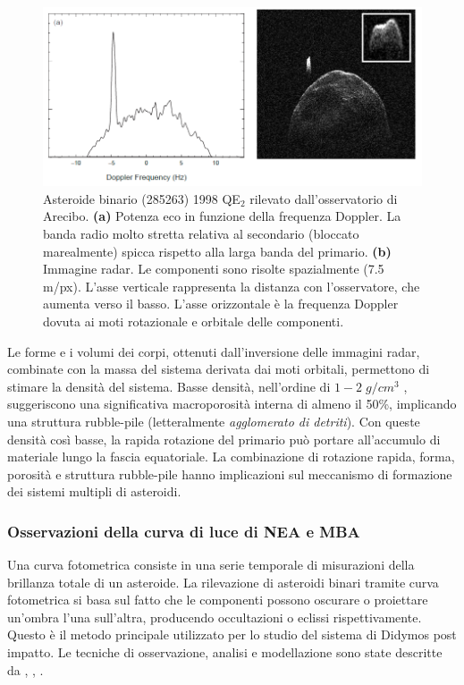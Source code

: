 \documentclass[a4paper,11pt,openright]{book}
\begin{document}
\begin{figure}[!h]
    \centering
    \includegraphics[scale=0.4]{figure/radar_image.png}
    \caption[Asteroide binario (285263) 1998 QE$_2$ rilevato dall'osservatorio di Arecibo.]{Asteroide binario (285263) 1998 QE$_2$ rilevato dall'osservatorio di Arecibo. \textbf{(a)} Potenza eco in funzione della frequenza Doppler. La banda radio molto stretta relativa al secondario (bloccato marealmente) spicca rispetto alla larga banda del primario. \textbf{(b)} Immagine radar. Le componenti sono risolte spazialmente (7.5 m/px). L'asse verticale rappresenta la distanza con l'osservatore, che aumenta verso il basso. L'asse orizzontale è la frequenza Doppler dovuta ai moti rotazionale e orbitale delle componenti. \citep{michel_asteroid_2015-1}}
    \label{fig:radar_image}
\end{figure}

Le forme e i volumi dei corpi, ottenuti dall'inversione delle immagini radar, combinate con la massa del sistema derivata dai moti orbitali, permettono di stimare la densità del sistema. Basse densità, nell'ordine di $1-2\;g/cm^3$ \citep{becker_physical_2015, brozovic_radar_2011}, suggeriscono una significativa macroporosità interna di almeno il 50\%, implicando una struttura rubble-pile (letteralmente \textit{agglomerato di detriti}). Con queste densità così basse, la rapida rotazione del primario può portare all'accumulo di materiale lungo la fascia equatoriale. La combinazione di rotazione rapida, forma, porosità e struttura rubble-pile hanno implicazioni sul meccanismo di formazione dei sistemi multipli di asteroidi.

\subsubsection{Osservazioni della curva di luce di NEA e MBA}
Una curva fotometrica consiste in una serie temporale di misurazioni della brillanza totale di un asteroide. La rilevazione di asteroidi binari tramite curva fotometrica si basa sul fatto che le componenti possono oscurare o proiettare un'ombra l'una sull'altra, producendo occultazioni o eclissi rispettivamente. Questo è il metodo principale utilizzato per lo studio del sistema di Didymos post impatto. Le tecniche di osservazione, analisi e modellazione sono state descritte da \citet{pravec_photometric_2006}, \citet{scheirich_modeling_2009}, \citet{scheirich_binary_2015}.
\end{document}

